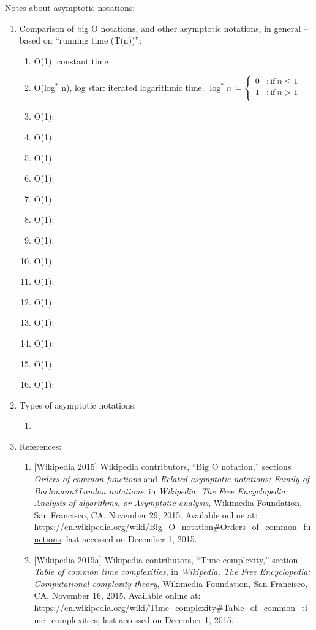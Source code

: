 Notes about asymptotic notations: \vspace{-0.3cm}
\begin{enumerate} \itemsep -4pt
\item Comparison of big O notations, and other asymptotic notations, in general -- based on ``running time (T(n))'': \vspace{-0.3cm}
	\begin{enumerate} \itemsep -2pt
	\item O(1): constant time
	\item O(log$^{\ast}$ n), log star: iterated logarithmic time. $\log^{\ast} n \coloneqq
		\begin{cases}
		0 &: \mathrm{if}\ n \leq 1 \\
		1 &: \mathrm{if}\ n > 1 \\
		\end{cases}$
	\item O(1): 
	\item O(1): 
	\item O(1): 
	\item O(1): 
	\item O(1): 
	\item O(1): 
	\item O(1): 
	\item O(1): 
	\item O(1): 
	\item O(1): 
	\item O(1): 
	\item O(1): 
	\item O(1): 
	\item O(1): 
	\end{enumerate}
\item Types of asymptotic notations: \vspace{-0.3cm}
	\begin{enumerate} \itemsep -2pt
	\item 
	\end{enumerate}
\item References: \vspace{-0.3cm}
	\begin{enumerate} \itemsep -2pt
	\item $[$Wikipedia 2015$]$ Wikipedia contributors, ``Big O notation,'' sections {\it Orders of common functions} and {\it Related asymptotic notations: Family of Bachmann?Landau notations}, in {\it Wikipedia, The Free Encyclopedia: Analysis of algorithms, or Asymptotic analysis}, Wikimedia Foundation, San Francisco, CA, November 29, 2015. Available online at: \url{https://en.wikipedia.org/wiki/Big_O_notation#Orders_of_common_functions}; last accessed on December 1, 2015.
	\item $[$Wikipedia 2015a$]$ Wikipedia contributors, ``Time complexity,'' section {\it Table of common time complexities}, in {\it Wikipedia, The Free Encyclopedia: Computational complexity theory}, Wikimedia Foundation, San Francisco, CA, November 16, 2015. Available online at: \url{https://en.wikipedia.org/wiki/Time_complexity#Table_of_common_time_complexities}; last accessed on December 1, 2015.
	\end{enumerate}
\end{enumerate}

